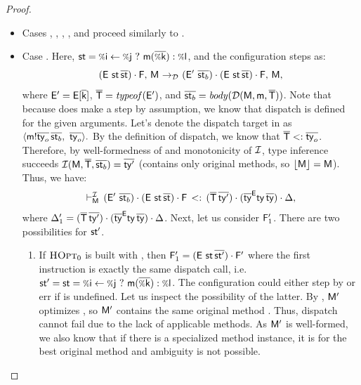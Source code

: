 {\begin{proof}
{\begin{itemize}
    \item Cases , , , , and 
      proceed similarly to .

    \item Case . Here, $\st = \cond\i\j{\call\m{\ol{\v\k}}}{\v\l}$,
      and the configuration steps as:
      \[
        \config{\stk{(\env\ \st\,\ol\st)}{\frm}}{\mtbl} \stepd
        \config{\stk{(\env'\ \ol{\st_b})}{\stk{(\env\ \st\,\ol\st)}{\frm}}}{\mtbl},
      \]
      where $\mathsf{E}' = \mathsf{E}[{\mathsf{\overline{\mathsf{k}}}}]$, $\overline{\mathsf{T}} = \operatorname{\mathit{typeof}}(\mathsf{E}')$, and
      $\overline{\mathsf{st}_b} = \operatorname{\mathit{body}}(\operatorname{{\mathcal D}}(\mathsf{M},\mathsf{\mathsf{m}},{\overline{\mathsf{T}}}))$.
      Note that because  does make a step by assumption,
      we know that dispatch is defined for the given arguments.
      Let's denote the dispatch target in \mtbl as
      $\langle \meth\m{\ol{\ty_o}}{}\ol{\st_b},\ \ol{\ty_o} \rangle.$
      By the definition of dispatch, we know that $\overline{\mathsf{T}} <: \overline{\mathsf{ty}_o}$.
      Therefore, by well-formedness of \mtbl and monotonicity of $\operatorname{\mathcal{I}}$,
      type inference succeeds
      $\operatorname{\mathcal{I}}(\mathsf{M}, \overline{\mathsf{T}}, \overline{\mathsf{st}_b}) = \overline{\mathsf{ty}'}$
      (\mtbl contains only original methods, so $\lfloor \mathsf{M} \rfloor = \mathsf{M}$).
      Thus, we have:
      \[
        \vdash^{\operatorname{\mathcal{I}}}_{\mathsf{M}}\,(\mathsf{E}'\ \overline{\mathsf{st}_b}) \cdot (\mathsf{E}\ \mathsf{st}\,\overline{\mathsf{st}}) \cdot \mathsf{F}\,<:\,(\overline{\mathsf{T}}\,\overline{\mathsf{ty}'}) \cdot (\overline{\mathsf{ty}}^{\mathsf{E}} \mathsf{ty}\,\overline{\mathsf{ty}}) \cdot \Delta,
      \]
      where $\Delta'_1 =
      (\overline{\mathsf{T}}\,\overline{\mathsf{ty}'}) \cdot (\overline{\mathsf{ty}}^{\mathsf{E}} \mathsf{ty}\,\overline{\mathsf{ty}}) \cdot \Delta$.
      Next, let us consider $\mathsf{F}'_1$.
      There are two possibilities for $\mathsf{st}'$.
      \begin{enumerate}
        \item If $\textsc{HOpt}_0$ is built with , then
          $\frm'_1 = \stk{(\env\ \st\,\ol{\st'})}{\frm'}$
          where the first instruction is exactly the same dispatch call, i.e.
          $\st' = \st = \cond\i\j{\call\m{\ol{\v\k}}}{\v\l}$.
          The configuration
          could either step by  or err if
           is undefined.
          Let us inspect the possibility of the latter.
          By , $\mathsf{M}'$ optimizes \mtbl, so $\mathsf{M}'$ contains the same
          original method . Thus, dispatch cannot fail
          due to the lack of applicable methods. As $\mathsf{M}'$ is well-formed,
          we also know that if there is a specialized method instance,
          it is for the best original method and ambiguity is not possible.

\end{enumerate}
\end{itemize}}
\end{proof}}

